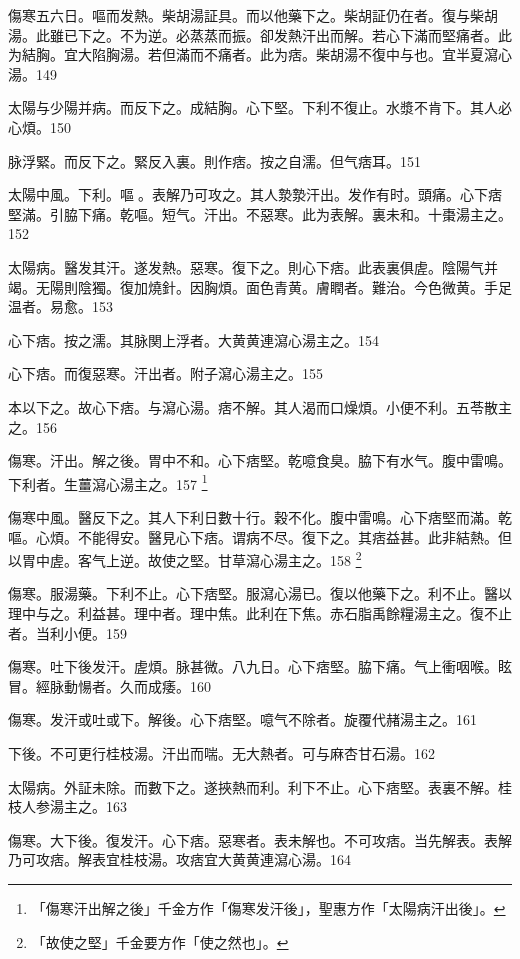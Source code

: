 傷寒五六日。嘔而发熱。柴胡湯証具。而以他藥下之。柴胡証仍在者。復与柴胡湯。此雖已下之。不为逆。必蒸蒸而振。卻发熱汗出而解。若心下滿而堅痛者。此为結胸。宜大陷胸湯。若但滿而不痛者。此为痞。柴胡{\khaaitp 湯}不復中与也。宜半夏瀉心湯。149

太陽与少陽并病。而反下之。{\khaaitp 成}結胸。心下堅。下利不{\khaaitp 復}止。水漿不{\khaaitp 肯}下。其人{\khaaitp 必}心煩。150

脉浮緊。而反下之。緊反入裏。則作痞。按之自濡。但气痞耳。151

太陽中風。下利。嘔{\sungtpii 𠱘}。表解乃可攻之。其人漐漐汗出。发作有时。頭痛。心下痞堅滿。引脇下痛。乾嘔。短气。汗出。不惡寒。此为表解。裏未和。十棗湯主之。152

太陽病。醫发其汗。遂发熱。惡寒。復下之。則心下痞。此表裏俱虗。陰陽气并竭。无陽則陰獨。復加燒針。因胸煩。面色青黄。膚瞤者。難治。今色微黄。手足温者。易愈。153

心下痞。按之濡。其脉関上浮者。大黄{\khaaitp 黄連}瀉心湯主之。154

心下痞。而復惡寒。汗出者。附子瀉心湯主之。155

本以下之。故心下痞。与瀉心湯。痞不解。其人渴而口燥{\khaaitp 煩}。小便不利。五苓散主之。156

傷寒。汗出。解之後。胃中不和。心下痞堅。乾噫食臭。脇下有水气。腹中雷鳴。下利者。生薑瀉心湯主之。157
	\footnote{「傷寒汗出解之後」千金方作「傷寒发汗後」，聖惠方作「太陽病汗出後」。}

傷寒中風。醫反下之。其人下利日數十行。穀不化。腹中雷鳴。心下痞堅而滿。乾嘔。心煩。不能得安。醫見心下痞。谓病不尽。復下之。其痞益甚。此非結熱。但以胃中虗。客气上逆。故使之堅。甘草瀉心湯主之。158
	\footnote{「故使之堅」千金要方作「使之然也」。}

傷寒。服湯藥。下利不止。心下痞堅。服瀉心湯已。復以他藥下之。利不止。醫以理中与之。利益甚。理中者。理中焦。此利在下焦。赤石脂禹餘糧湯主之。復不止者。当利小便。159

傷寒。吐下{\khaaitp 後}发汗。虗煩。脉甚微。八九日。心下痞堅。脇下痛。气上衝咽喉。眩冒。經脉動愓者。久而成痿。160

傷寒。发汗{\khaaitp 或}吐{\khaaitp 或}下。解後。心下痞堅。噫气不除者。旋覆代赭湯主之。161

下後。{\khaaitp 不可更行桂枝湯。}汗出而喘。无大熱者。可与麻杏甘石湯。162

太陽病。外証未除。而數下之。遂挾熱而利。利下不止。心下痞堅。表裏不解。桂枝人参湯主之。163

傷寒。大下後。復发汗。心下痞。惡寒者。表未解也。不可攻痞。当先解表。表解乃可攻痞。解表宜桂枝湯。攻痞宜大黄黄連瀉心湯。164

